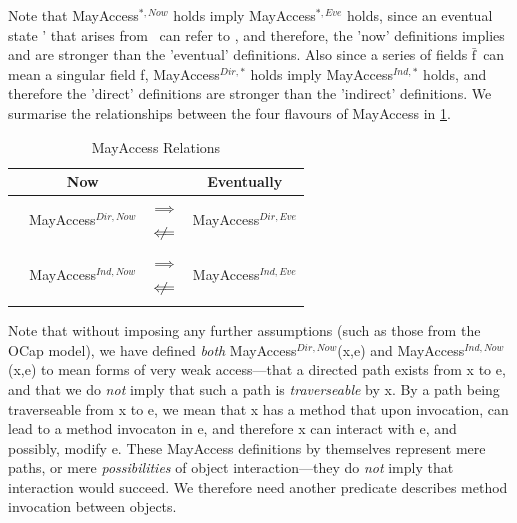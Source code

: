 \documentclass[a4paper,11pt, twoside,twocolumn]{article}
\newcommand*\rot{\rotatebox{90}}
\newcommand{\loimplies}{$\implies$}
\newcommand{\lonimplies}{$\centernot\implies$}
\newcommand{\loimpliedby}{$\Longleftarrow$}
\newcommand{\lonimpliedby}{$\centernot\Longleftarrow$}
\newcommand{\losigma}{\text{$\upsigma$}}
\newcommand{\loconj}[1] {$\bar{\text{#1}}$}
\begin{document}
Note that MayAccess$^{*,Now}$ holds imply MayAccess$^{*,Eve}$ holds, since an eventual state \losigma' that arises from \losigma\, can refer to \losigma, and therefore, the 'now' definitions implies and are stronger than the 'eventual' definitions. Also since a series of fields \loconj{f}\ can mean a singular field f, MayAccess$^{Dir,*}$ holds imply MayAccess$^{Ind,*}$ holds, and therefore the 'direct' definitions are stronger than the 'indirect' definitions. We surmarise the relationships between the four flavours of MayAccess in \ref{MayAccessRelations}.\\
\begin{table}[htb]
\small
\caption{MayAccess Relations}
\centering
\begin{tabular*}{\linewidth}{c|ccc}\toprule
& \bf Now & & \bf Eventually\\
\hline
\multirow{5}{*}{\rot{\bf Indirect \enspace Direct \:}} & \multirow{2}{*}{MayAccess$^{Dir,Now}$} & \loimplies & \multirow{2}{*}{MayAccess$^{Dir, Eve}$} \\
& & \lonimpliedby &  \\
& \rot{\loimpliedby} \rot{\lonimplies}& &\rot{\loimpliedby} \rot{\lonimplies} \\
& \multirow{2}{*}{MayAccess$^{Ind,Now}$} & \loimplies & \multirow{2}{*}{MayAccess$^{Ind, Eve}$} \\
& & \lonimpliedby &\\
\label{MayAccessRelations}
\end{tabular*}
\end{table}

Note that without imposing any further assumptions (such as those from the OCap model), we have defined \textit{both} MayAccess$^{Dir,Now}$(x,e) and MayAccess$^{Ind,Now}$(x,e) to mean forms of very weak access---that a directed path exists from x to e, and that we do \textit{not} imply that such a path is \textit{traverseable} by x. By a path being traverseable from x to e, we mean that x has a method that upon invocation, can lead to a method invocaton in e, and therefore x can interact with e, and possibly, modify e. These MayAccess definitions by themselves represent mere paths, or mere \textit{possibilities} of object interaction---they do \textit{not} imply that interaction would succeed. We therefore need another predicate describes method invocation between objects. 
\end{document}
